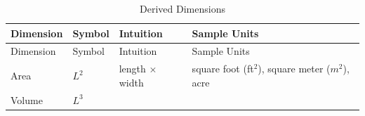 \documentclass[
]{book}
\begin{document}
\begin{longtable}[]{@{}llll@{}}
\caption{Derived Dimensions}\tabularnewline
\toprule
\begin{minipage}[b]{0.21\columnwidth}\raggedright
Dimension\strut
\end{minipage} & \begin{minipage}[b]{0.17\columnwidth}\raggedright
Symbol\strut
\end{minipage} & \begin{minipage}[b]{0.23\columnwidth}\raggedright
Intuition\strut
\end{minipage} & \begin{minipage}[b]{0.28\columnwidth}\raggedright
Sample Units\strut
\end{minipage}\tabularnewline
\midrule
\endfirsthead
\toprule
\begin{minipage}[b]{0.21\columnwidth}\raggedright
Dimension\strut
\end{minipage} & \begin{minipage}[b]{0.17\columnwidth}\raggedright
Symbol\strut
\end{minipage} & \begin{minipage}[b]{0.23\columnwidth}\raggedright
Intuition\strut
\end{minipage} & \begin{minipage}[b]{0.28\columnwidth}\raggedright
Sample Units\strut
\end{minipage}\tabularnewline
\midrule
\endhead
\begin{minipage}[t]{0.21\columnwidth}\raggedright
Area\strut
\end{minipage} & \begin{minipage}[t]{0.17\columnwidth}\raggedright
\(L^2\)\strut
\end{minipage} & \begin{minipage}[t]{0.23\columnwidth}\raggedright
length \(\times\) width\strut
\end{minipage} & \begin{minipage}[t]{0.28\columnwidth}\raggedright
square foot (ft\(^2\)), square meter (\(m^2\)), acre\strut
\end{minipage}\tabularnewline
\begin{minipage}[t]{0.21\columnwidth}\raggedright
Volume\strut
\end{minipage} & \begin{minipage}[t]{0.17\columnwidth}\raggedright
\(L^3\)\strut
\end{minipage} & \begin{minipage}[t]{0.23\columnwidth}\raggedright

\end{minipage}
\end{longtable}
\end{document}
